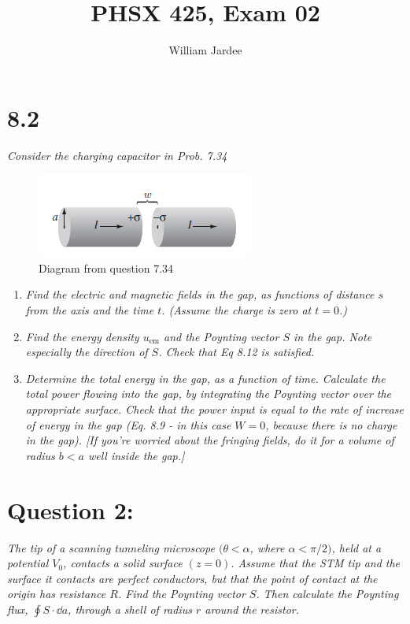 \documentclass[12pt]{article}
\title{PHSX 425, Exam 02}
\author{William Jardee}
\begin{document}
\maketitle

\section*{8.2}
\emph{Consider the charging capacitor in Prob. 7.34}
\begin{figure}[h]
\centering
\includegraphics[scale=1]{homework08_question1.png}
\caption{Diagram from question 7.34}
\label{fig:1.1}
\end{figure}
\begin{enumerate}[label=\alph*)]
\item \emph{Find the electric and magnetic fields in the gap, as functions of distance $s$ from the axis and the time $t$. (Assume the charge is zero at $t=0$.)}\bigskip

\item \emph{Find the energy density $u_\text{em}$ and the Poynting vector $S$ in the gap. Note especially the direction of $S$. Check that Eq 8.12 is satisfied.}\bigskip

\item \emph{Determine the total energy in the gap, as a function of time. Calculate the total power flowing into the gap, by integrating the Poynting vector over the appropriate surface. Check that the power input is equal to the rate of increase of energy in the gap (Eq. 8.9 - in this case $W=0$, because there is no charge in the gap). [If you're worried about the fringing fields, do it for a volume of radius $b<a$ well inside the gap.]}\bigskip
\end{enumerate}

\section*{Question 2:}
\emph{The tip of a scanning tunneling microscope $(\theta < \alpha$, where $\alpha < \pi/2)$, held at a potential $V_0$, contacts a solid surface $(z=0)$. Assume that the STM tip and the surface it contacts are perfect conductors, but that the point of contact at the origin has resistance $R$. Find the Poynting vector $S$. Then calculate the Poynting flux, $\oint S\cdot \dd{a}$, through a shell of radius $r$ around the resistor.}\bigskip
\end{document}
